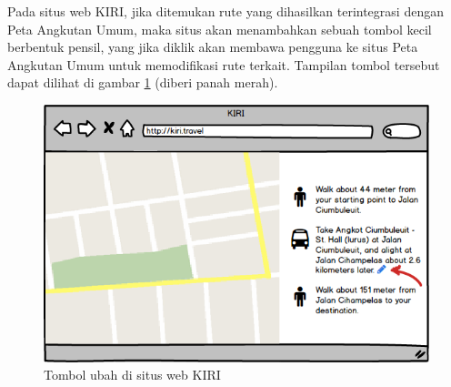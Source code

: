 Pada situs web KIRI, jika ditemukan rute yang dihasilkan terintegrasi dengan Peta Angkutan Umum, maka situs akan menambahkan sebuah tombol kecil berbentuk pensil, yang jika diklik akan membawa pengguna ke situs Peta Angkutan Umum untuk memodifikasi rute terkait. Tampilan tombol tersebut dapat dilihat di gambar \ref{fig:4_tombolubah} (diberi panah merah).

\begin{figure}
	\centering
	\includegraphics[scale=0.5]{Gambar/4_tombolubah}
	\caption{Tombol ubah di situs web KIRI} 
	\label{fig:4_tombolubah}
\end{figure}